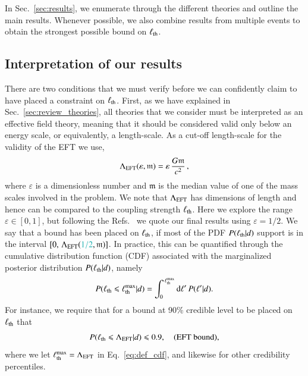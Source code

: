 \documentclass[twocolumn,
               prd,
               aps,
               superscriptaddress,
               tightenlines,
               nofootinbib,
               eqsecnum,
               amsfonts,
               amsmath,
               longbibliography]{revtex4-1}
\newcommand{\dd}{{\rm d}}
\newcommand{\hs}[1]{{\textcolor{TealBlue}{{#1}}}}
\begin{document}
In Sec.~\ref{sec:results}, we enumerate through the different theories and
outline the main results. Whenever possible, we also combine results from
multiple events to obtain the strongest possible bound on $\ell_{\rm th}$.

\subsection{Interpretation of our results}
\label{sec:remarks}

There are two conditions that we must verify before we can confidently claim to
have placed a constraint on $\ell_{\rm th}$. First, as we have explained in Sec.~\ref{sec:review_theories}, all theories that we
consider must be interpreted as an effective field theory, meaning that it should be
considered valid only below an energy scale, or equivalently, a length-scale.
%
As a cut-off length-scale for the validity of the EFT we use,
%
\begin{equation}
\Lambda_{\rm EFT} (\varepsilon, \mathfrak{m}) = \varepsilon \, \frac{G \mathfrak{m}}{c^2} \,,
\label{eq:def_cutoff}
\end{equation}
%
where $\varepsilon$ is a dimensionless number and $\mathfrak{m}$ is the median
value of one of the mass scales involved in the problem.
%
We note that $\Lambda_{\rm EFT}$ has dimensions of length and hence can be compared to the coupling strength $\ell_{\rm th}$.
%
\hs{Here we explore the range $\varepsilon \in [0, 1]$, but following
the Refs.~\cite{Nair:2019iur,Perkins:2021mhb,Lyu:2022gdr} we quote our final results using
$\varepsilon = 1/2$.}
We say that a bound has been placed on $\ell_{\rm th}$, if most of the PDF $P(\ell_{\rm th} | d)$ support is in the interval
$[0, \, \Lambda_{\rm EFT}(\hs{1/2}, \mathfrak{m})]$.
%
In practice, this can be quantified through the cumulative distribution function
(CDF) associated with the marginalized posterior distribution $P(\ell_{\rm th} | d)$, namely
%
\begin{equation}
P(\ell_{\rm th} \leqslant \ell^{\rm max}_{\rm th} | d) = \int_{0}^{\,\ell^{\rm max}_{\rm th}} \dd \ell'\, P(\ell' | d).
\label{eq:def_cdf}
\end{equation}
%
For instance, we require that for a bound at 90\% credible level to be placed on $\ell_{\rm th}$ that
%
\begin{equation}
P(\ell_{\rm th} \leqslant \Lambda_{\rm EFT} | d) \leqslant 0.9,
\quad \textrm{(EFT bound)},
\label{eq:eft_bound}
\end{equation}
%
where we let $\ell^{\rm max}_{\rm th} = \Lambda_{\rm EFT}$ in Eq.~\eqref{eq:def_cdf}, and
likewise for other credibility percentiles.
\end{document}
